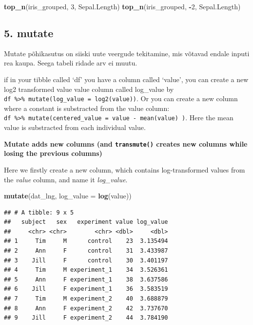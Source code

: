 \documentclass[]{book}
\newenvironment{Shaded}{\begin{snugshade}}{\end{snugshade}}
\newcommand{\KeywordTok}[1]{\textcolor[rgb]{0.13,0.29,0.53}{\textbf{#1}}}
\newcommand{\DataTypeTok}[1]{\textcolor[rgb]{0.13,0.29,0.53}{#1}}
\newcommand{\DecValTok}[1]{\textcolor[rgb]{0.00,0.00,0.81}{#1}}
\newcommand{\OperatorTok}[1]{\textcolor[rgb]{0.81,0.36,0.00}{\textbf{#1}}}
\newcommand{\NormalTok}[1]{#1}
\begin{document}
\begin{Shaded}
\begin{Highlighting}[]
\KeywordTok{top_n}\NormalTok{(iris_grouped, }\DecValTok{3}\NormalTok{, Sepal.Length)}
\KeywordTok{top_n}\NormalTok{(iris_grouped, }\OperatorTok{-}\DecValTok{2}\NormalTok{, Sepal.Length)}
\end{Highlighting}
\end{Shaded}

\subsection{5. mutate}\label{mutate}

Mutate põhikasutus on siiski uute veergude tekitamine, mis võtavad
endale inputi rea kaupa. Seega tabeli ridade arv ei muutu.

if in your tibble called `df' you have a column called `value', you can
create a new log2 transformed value value column called log\_value by
\texttt{df\ \%\textgreater{}\%\ mutate(log\_value\ =\ log2(value))}. Or
you can create a new column where a constant is substracted from the
value column:
\texttt{df\ \%\textgreater{}\%\ mutate(centered\_value\ =\ value\ -\ mean(value)\ )}.
Here the mean value is substracted from each individual value.

\textbf{Mutate adds new columns (and \texttt{transmute()} creates new
columns while losing the previous columns)}

Here we firstly create a new column, which contains log-transformed
values from the \emph{value} column, and name it \emph{log\_value}.

\begin{Shaded}
\begin{Highlighting}[]
\KeywordTok{mutate}\NormalTok{(dat_lng, }\DataTypeTok{log_value =} \KeywordTok{log}\NormalTok{(value))}
\end{Highlighting}
\end{Shaded}

\begin{verbatim}
## # A tibble: 9 x 5
##   subject   sex   experiment value log_value
##     <chr> <chr>        <chr> <dbl>     <dbl>
## 1     Tim     M      control    23  3.135494
## 2     Ann     F      control    31  3.433987
## 3    Jill     F      control    30  3.401197
## 4     Tim     M experiment_1    34  3.526361
## 5     Ann     F experiment_1    38  3.637586
## 6    Jill     F experiment_1    36  3.583519
## 7     Tim     M experiment_2    40  3.688879
## 8     Ann     F experiment_2    42  3.737670
## 9    Jill     F experiment_2    44  3.784190
\end{verbatim}
\end{document}

